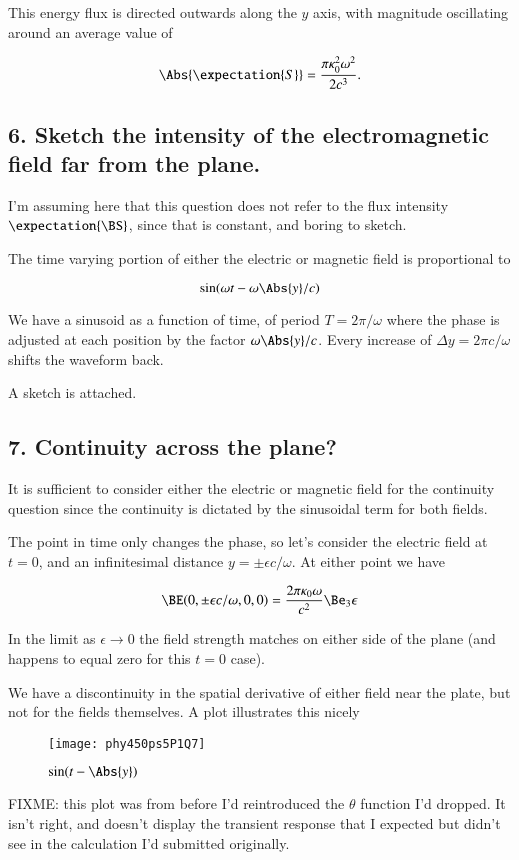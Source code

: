 This energy flux is directed outwards along the $y$ axis, with magnitude oscillating around an average value of

\begin{equation}\label{eqn:relElectroDynProblemSet5P1:260}
\Abs{\expectation{S}} = \frac{ \pi \kappa_0^2 \omega^2 }{2 c^3}.
\end{equation}

\subsection{6. Sketch the intensity of the electromagnetic field far from the plane.}

I'm assuming here that this question does not refer to the flux intensity $\expectation{\BS}$, since that is constant, and boring to sketch.

The time varying portion of either the electric or magnetic field is proportional to

\begin{equation}\label{eqn:relElectroDynProblemSet5P1:261}
\sin( \omega t - \omega \Abs{y}/c )
\end{equation}

We have a sinusoid as a function of time, of period $T = 2 \pi/\omega$ where the phase is adjusted at each position by the factor $\omega \Abs{y}/c$.  Every increase of $\Delta y = 2 \pi c/\omega$ shifts the waveform back.

A sketch is attached.

\subsection{7. Continuity across the plane?}

It is sufficient to consider either the electric or magnetic field for the continuity question since the continuity is dictated by the sinusoidal term for both fields.

The point in time only changes the phase, so let's consider the electric field at $t=0$, and an infinitesimal distance $y = \pm \epsilon c/\omega$.  At either point we have

\begin{equation}\label{eqn:relElectroDynProblemSet5P1:262}
\BE(0, \pm \epsilon c/\omega, 0, 0) = \frac{ 2 \pi \kappa_0 \omega }{c^2} \Be_3 \epsilon
\end{equation}

In the limit as $\epsilon \rightarrow 0$ the field strength matches on either side of the plane (and happens to equal zero for this $t= 0$ case).

We have a discontinuity in the spatial derivative of either field near the plate, but not for the fields themselves.  A plot illustrates this nicely

\begin{figure}[htp]
\centering
\texttt{[image: phy450ps5P1Q7]}
\caption{$\sin(t - \Abs{y})$}\label{fig:phy450ps5P1Q7}
\end{figure}

FIXME: this plot was from before I'd reintroduced the $\theta$ function I'd dropped.  It isn't right, and doesn't display the transient response that I expected but didn't see in the calculation I'd submitted originally.
